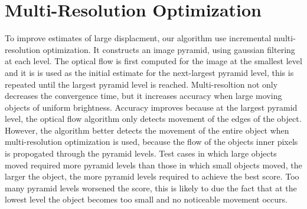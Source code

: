 \documentclass[10pt,twocolumn,letterpaper]{article}
\begin{document}
\section{Multi-Resolution Optimization}
To improve estimates of large displacment, our algorithm use incremental multi-resolution optimization. It constructs an image pyramid, using gaussian filtering at each level. The optical flow is first computed for the image at the smallest level and it is is used as the initial estimate for the next-largest pyramid level, this is repeated until the largest pyramid level is reached. Multi-resoltion not only decreases the convergence time, but it increases accuracy when large moving objects of uniform brightness. Accuracy improves because at the largest pyramid level, the optical flow algorithm only detects movement of the edges of the object. However, the algorithm better detects the movement of the entire object when multi-resolution optimization is used, because the flow of the objects inner pixels is propogated through the pyramid levels.
Test cases in which large objects moved required more pyramid levels than those in which small objects moved, the larger the object, the more pyramid levels required to achieve the best score. Too many pyramid levels worsened the score, this is likely to due the fact that at the lowest level the object becomes too small and no noticeable movement occurs.
\end{document}
